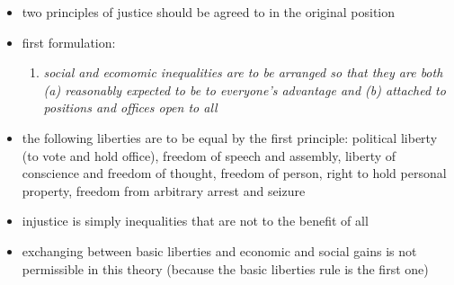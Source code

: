 \begin{itemize}
	\item two principles of justice should be agreed to in the original
	position
	\item first formulation:
	\begin{enumerate}
		\itemize \textit{each person is to have an equal right to the
		most extensive scheme of equal basic liberties compatible with
		a similar scheme of liberties for others}
		\item \textit{social and ecomomic inequalities are to be
		arranged so that they are both (a) reasonably expected to be
		to everyone's advantage and (b) attached to positions and
		offices open to all}
	\end{enumerate}
	\item the following liberties are to be equal by the first principle:
	political liberty (to vote and hold office), freedom of speech and
	assembly, liberty of conscience and freedom of thought, freedom of
	person, right to hold personal property, freedom from arbitrary arrest
	and seizure
	\item injustice is simply inequalities that are not to the benefit of
	all
	\item exchanging between basic liberties and economic and social gains
	is not permissible in this theory (because the basic liberties rule
	is the first one)
\end{itemize}
